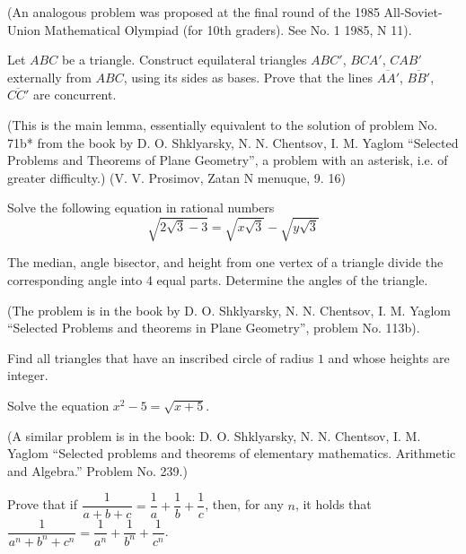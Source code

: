 \documentclass{article}
\begin{document}
(An analogous problem was proposed at the final round of the 1985 All-Soviet-Union Mathematical Olympiad (for 10th graders). See No. 1 1985, N 11).



\problem  %
Let $ABC$ be a triangle.
Construct equilateral triangles $ABC'$, $BCA'$, $CAB'$
externally from $ABC$, using its sides as bases.
Prove that the lines $\overline{AA'}$, $\overline{BB'}$, $\overline{CC'}$ are concurrent.

(This is the main lemma, essentially equivalent to the solution of problem No. 71b*
from the book by D. O. Shklyarsky, N. N. Chentsov, I. M. Yaglom ``Selected Problems and Theorems of Plane Geometry'',
a problem with an asterisk, i.e. of greater difficulty.) \newline
(V. V. Prosimov, Zatan N menuque, 9. 16)


\problem  %
Solve the following equation in rational numbers
\begin{equation*}
  \sqrt{2 \sqrt{3} - 3} = \sqrt{x \sqrt{3}} - \sqrt{y \sqrt{3}}
\end{equation*}


\problem  %
The median, angle bisector, and height from one vertex of a triangle
divide the corresponding angle into 4 equal parts.
Determine the angles of the triangle.

(The problem is in the book by D. O. Shklyarsky, N. N. Chentsov, I. M. Yaglom ``Selected Problems and theorems in Plane Geometry'', problem No. 113b).


\problem  %
Find all triangles that have an inscribed circle of radius $1$
and whose heights are integer.


\problem  %
Solve the equation
$x^2 - 5 = \sqrt{x + 5}$.

(A similar problem is in the book:
D. O. Shklyarsky, N. N. Chentsov, I. M. Yaglom
``Selected problems and theorems of elementary mathematics. Arithmetic and Algebra.''
Problem No. 239.)


\problem  %
Prove that if
$\dfrac{1}{\mspace{1mu} a + b + c \mspace{1mu}} = \dfrac{1}{a} + \dfrac{1}{b} + \dfrac{1}{c}$,
then, for any $n$, it holds that
$\dfrac{1}{\mspace{1mu} a^n + b^n + c^n \mspace{1mu}} = \dfrac{1}{a^n} + \dfrac{1}{b^n} + \dfrac{1}{c^n}$.
\end{document}

